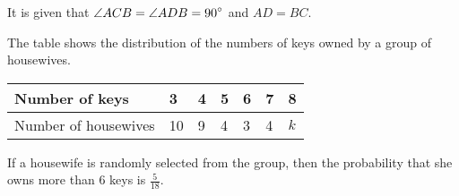 \documentclass[11pt,paper=a4,answers]{exam}
\begin{document}
\begin{questions}
    It is given that 
    $\displaystyle \angle ACB = \angle ADB = 90\degree$ and $\displaystyle AD = BC$.
    
    \droppoints

\vspace{0.5cm}
\label{2024-I-9: Stats/ Central Tendency}
\question[5]
    The table shows the distribution of the numbers of keys owned by a group of housewives.

    \begin{center}
        \begin{tabular}{|M{4cm}||M{1cm}|M{1cm}|M{1cm}|M{1cm}|M{1cm}|M{1cm}|}
        \hline
        Number of keys & 3 & 4 & 5 & 6 & 7 & 8 \\ \hline
        Number of housewives & 10 & 9 & 4 & 3 & 4 & $k$
        \\
        \hline
        \end{tabular}
    \end{center}

    If a housewife is randomly selected from the group, then the probability that she owns more than 6 keys is $\displaystyle \frac{5}{18}$.
    
    \droppoints
\end{questions}
\end{document}
